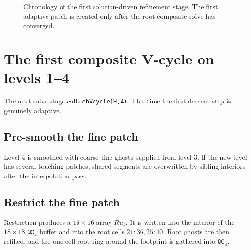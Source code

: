 \documentclass[11pt,oneside,openany]{book}
\newcommand{\code}[1]{\textnormal{\texttt{#1}}}
\begin{document}
\begin{figure}[htbp]
\centering
{}
\caption{Chronology of the first solution-driven refinement stage. The first adaptive patch is created only after the root composite solve has converged.}
\label{fig:dryruntimeline}
\end{figure}

\section{The first composite V-cycle on levels 1--4}
The next solve stage calls \code{ebVcycle(H,4)}. This time the first descent step is genuinely adaptive.

\subsection{Pre-smooth the fine patch}
Level 4 is smoothed with coarse--fine ghosts supplied from level 3. If the new level has several touching patches, shared segments are overwritten by sibling interiors after the interpolation pass.

\subsection{Restrict the fine patch}
Restriction produces a $16\times16$ array $R u_4$. It is written into the interior of the $18\times18$ \ensuremath{\mathtt{QC}_{4}} buffer and into the root cells $21{:}36,25{:}40$. Root ghosts are then refilled, and the one-cell root ring around the footprint is gathered into \ensuremath{\mathtt{QC}_{4}}.
\end{document}
